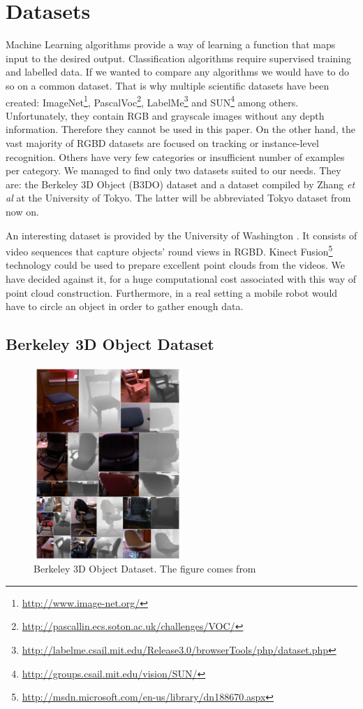 \section{Datasets}

	Machine Learning algorithms provide a way of learning a function that maps input to the desired output. Classification algorithms require supervised training and labelled data. If we wanted to compare any algorithms we would have to do so on a common dataset. That is why multiple scientific datasets have been created: ImageNet\footnote{\url{http://www.image-net.org/}}, PascalVoc\footnote{\url{http://pascallin.ecs.soton.ac.uk/challenges/VOC/}}, LabelMe\footnote{\url{http://labelme.csail.mit.edu/Release3.0/browserTools/php/dataset.php}} and SUN\footnote{\url{http://groups.csail.mit.edu/vision/SUN/}} among others. Unfortunately, they contain RGB and grayscale images without any depth information. Therefore they cannot be used in this paper. On the other hand, the vast majority of RGBD datasets are focused on tracking or instance-level recognition. Others have very few categories or insufficient number of examples per category. We managed to find only two datasets suited to our needs. They are: the Berkeley 3D Object (B3DO) dataset \cite{B3DO} and a dataset compiled by Zhang \emph{et al} at the University of Tokyo\cite{zhangcategory}. The latter will be abbreviated Tokyo dataset from now on. 
	
	An interesting dataset is provided by the University of Washington \cite{dataset_washington}. It consists of video sequences that capture objects' round views in RGBD. Kinect Fusion\footnote{\url{http://msdn.microsoft.com/en-us/library/dn188670.aspx}} technology could be used to prepare excellent point clouds from the videos. We have decided against it, for a huge computational cost associated with this way of point cloud construction. Furthermore, in a real setting a mobile robot would have to circle an object in order to gather enough data.

	\subsection{Berkeley 3D Object Dataset}
	\begin{figure}[!ht]
	\centering
	\includegraphics[width=0.5\textwidth]{figs/b3do_dataset}
	\caption{Berkeley 3D Object Dataset. The figure comes from \cite{B3DO}}
	\label{fig:b3do}
	\end{figure}
	
